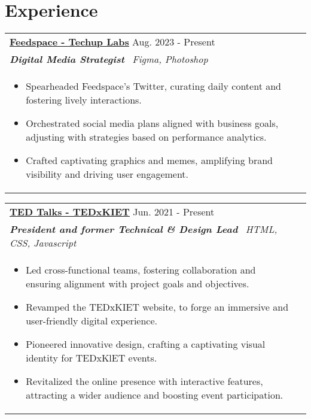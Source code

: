 \documentclass[a4paper,8pt]{article}
\begin{document}
\section{Experience}
\begin{tabularx}{\linewidth}{ @{}l r@{} }
\textbf{\uline{\href{https://www.feedspace.io/}{Feedspace - Techup Labs}}} \hfill \color[HTML]{371e77} Aug. 2023 - Present \\[4pt]
\color[HTML]{371e77}\textbf{\textit{Digital Media Strategist}}\ \hfill \color[HTML]{4B28A4} \textit{Figma, Photoshop} \\[5pt]
\begin{minipage}[t]{\linewidth}
    \begin{itemize}[nosep,after=\strut, leftmargin=2em, itemsep=2pt]
        \item Spearheaded Feedspace's Twitter, curating daily content and fostering lively interactions.
        \item Orchestrated social media plans aligned with business goals, adjusting with strategies based on performance analytics.
        \item Crafted captivating graphics and memes, amplifying brand visibility and driving user engagement.
    \end{itemize}
\end{minipage}
\end{tabularx}

\begin{tabularx}{\linewidth}{ @{}l r@{} }
\color[HTML]{1C033C} \textbf{\uline{\href{https://tedxkiet.com/}{TED Talks - TEDxKIET}}} \hfill \color[HTML]{371e77} Jun. 2021 - Present \\[4pt]
\color[HTML]{371e77}\textbf{\textit{President and former Technical \& Design Lead}}\ \hfill \color[HTML]{4B28A4} \textit{HTML, CSS, Javascript} \\[5pt]
\begin{minipage}[t]{\linewidth}
    \begin{itemize}[nosep,after=\strut, leftmargin=2em, itemsep=2pt]
        \item Led cross-functional teams, fostering collaboration and ensuring alignment with project goals and objectives.
        \item Revamped the TEDxKIET website, to forge an immersive and user-friendly digital experience.
        \item Pioneered innovative design, crafting a captivating visual identity for TEDxKlET events.
        \item Revitalized the online presence with interactive features, attracting a wider audience and boosting event participation.
    \end{itemize}
\end{minipage}
\end{tabularx}
\end{document}
